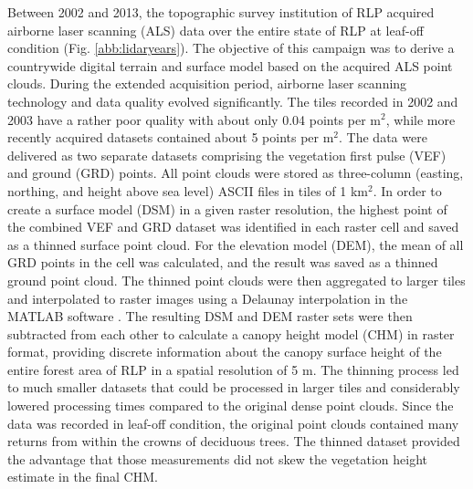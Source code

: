 Between 2002 and 2013, the topographic survey institution of RLP acquired airborne laser scanning (ALS) data over the entire state of RLP at leaf-off condition (Fig. \ref{abb:lidaryears}). The objective of this campaign was to derive a countrywide digital terrain and surface model based on the acquired ALS point clouds. During the extended acquisition period, airborne laser scanning technology and data quality evolved significantly. The tiles recorded in 2002 and 2003 have a rather poor quality with about only 0.04 points per m$^2$, while more recently acquired datasets contained about 5 points per m$^2$. The data were delivered as two separate datasets comprising the vegetation first pulse (VEF) and ground (GRD) points. All point clouds were stored as three-column (easting, northing, and height above sea level) ASCII files in tiles of 1 km$^2$. In order to create a surface model (DSM) in a given raster resolution, the highest point of the combined VEF and GRD dataset was identified in each raster cell and saved as a thinned surface point cloud. For the elevation model (DEM), the mean of all GRD points in the cell was calculated, and the result was saved as a thinned ground point cloud. The thinned point clouds were then aggregated to larger tiles and interpolated to raster images using a Delaunay interpolation in the MATLAB software \citep{matlab}. The resulting DSM and DEM raster sets were then subtracted from each other to calculate a canopy height model (CHM) in raster format, providing discrete information about the canopy surface height of the entire forest area of RLP in a spatial resolution of 5 m. The thinning process led to much smaller datasets that could be processed in larger tiles and considerably lowered processing times compared to the original dense point clouds. Since the data was recorded in leaf-off condition, the original point clouds contained many returns from within the crowns of deciduous trees. The thinned dataset provided the advantage that those measurements did not skew the vegetation height estimate in the final CHM.\par
